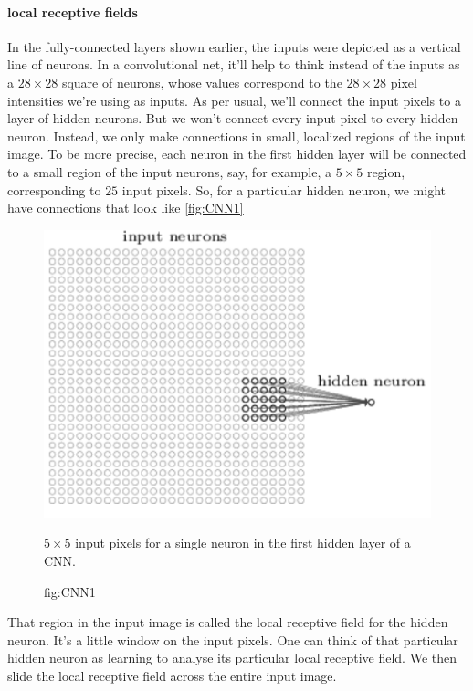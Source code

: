 \documentclass[12pt, letterpaper]{article}
\theoremstyle{definition}
\let\tb\textbf
\begin{document}
\paragraph{\tb{local receptive fields}} In the fully-connected layers shown earlier, the inputs were depicted as a vertical line of neurons. In a convolutional net, it'll help to think instead of the inputs as a $28\times 28$ square of neurons, whose values correspond to the $28\times 28$ pixel intensities we're using as inputs. As per usual, we'll connect the input pixels to a layer of hidden neurons. But we won't connect every input pixel to every hidden neuron. Instead, we only make connections in small, localized regions of the input image. To be more precise, each neuron in the first hidden layer will be connected to a small region of the input neurons, say, for example, a $5\times5$ region, corresponding to $25$ input pixels. So, for a particular hidden neuron, we might have connections that look like \autoref{fig:CNN1}
\begin{figure}
\centering
\includegraphics[scale=0.5]{img/CNN1}
\caption{$5\times 5$ input pixels for a single neuron in the first hidden layer of a CNN.}
\caption{fig:CNN1}
\end{figure}
That region in the input image is called the local receptive field for the hidden neuron. It's a little window on the input pixels. One can think of that particular hidden neuron as learning to analyse its particular local receptive field. We then slide the local receptive field across the entire input image.
\end{document}
